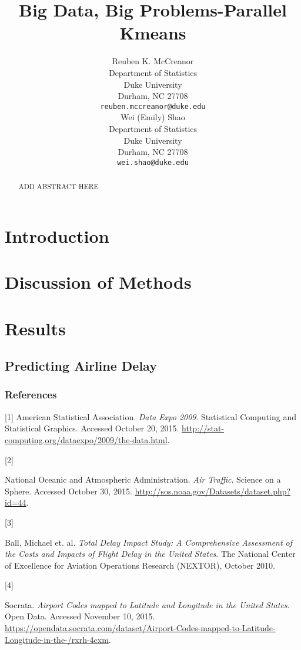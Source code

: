 \documentclass{article} %
\title{Big Data, Big Problems-Parallel Kmeans}
\author{
Reuben K. McCreanor \\
Department of Statistics\\
Duke University\\
Durham, NC 27708 \\
\texttt{reuben.mccreanor@duke.edu} \\
\And
Wei (Emily) Shao\\
Department of Statistics\\
Duke University\\
Durham, NC 27708 \\
\texttt{wei.shao@duke.edu} \\
}
\begin{document}
\maketitle

\begin{abstract}
ADD ABSTRACT HERE
\end{abstract}

\section{Introduction}
\label{headings}


\section{Discussion of Methods}
\label{headings}


\section{Results}
\label{headings}

\subsection{Predicting Airline Delay}


\clearpage
\newpage


\subsubsection*{References}


\hypertarget{Ref1}{[1] American Statistical Association. \textit{Data Expo 2009}. Statistical Computing and Statistical Graphics. Accessed October 20, 2015. \url{http://stat-computing.org/dataexpo/2009/the-data.html}.}

\hypertarget{Ref2}{[2]} National Oceanic and Atmospheric Administration. \textit{Air Traffic}. Science on a Sphere. Accessed October 30, 2015. \url{http://sos.noaa.gov/Datasets/dataset.php?id=44}.

\hypertarget{Ref3}{[3]} Ball, Michael et. al. \textit{Total Delay Impact Study: A Comprehensive Assessment of the Costs and Impacts of Flight Delay in the United States}. The National Center of Excellence for Aviation Operations Research (NEXTOR), October 2010.

\hypertarget{Ref4}{[4]} Socrata. \textit{Airport Codes mapped to Latitude and Longitude in the United States}. Open Data. Accessed November 10, 2015. \url{https://opendata.socrata.com/dataset/Airport-Codes-mapped-to-Latitude-Longitude-in-the-/rxrh-4cxm}.
\end{document}
